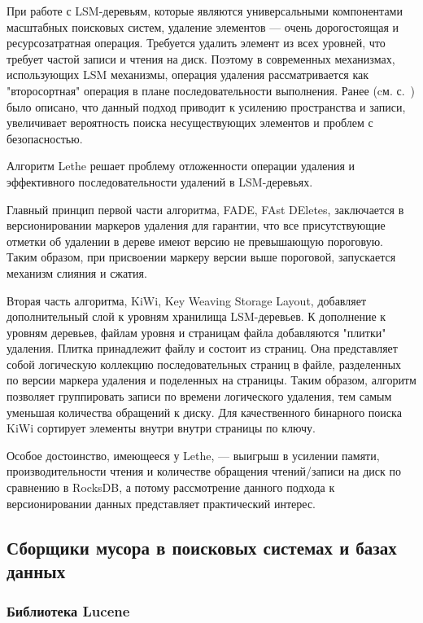 При работе с LSM-деревьям, которые являются универсальными компонентами масштабных
поисковых систем, удаление элементов — очень дорогостоящая и ресурсозатратная операция.
Требуется удалить элемент из всех уровней, что требует частой записи и чтения на диск.
Поэтому в современных механизмах, использующих LSM механизмы, операция удаления
рассматривается как "второсортная" операция в плане последовательности выполнения.
Ранее (cм. с.~\pageref{amplification}) было описано, что данный подход приводит к
усилению пространства и записи, увеличивает вероятность поиска несуществующих
элементов и проблем с безопасностью.

Алгоритм Lethe \cite{Lethe:2020} решает проблему отложенности операции удаления и
эффективного последовательности удалений в LSM-деревьях. 

Главный принцип первой части алгоритма, FADE, FAst DEletes, заключается в 
версионировании маркеров удаления для гарантии, что все присутствующие отметки об
удалении в дереве имеют версию не превышающую пороговую. Таким образом, при присвоении
маркеру версии выше пороговой, запускается механизм слияния и сжатия.

Вторая часть алгоритма, KiWi, Key Weaving Storage Layout, добавляет
дополнительный слой к уровням хранилища LSM-деревьев. К дополнение к уровням деревьев,
файлам уровня и страницам файла добавляются "плитки" удаления. Плитка принадлежит 
файлу и состоит из страниц. Она представляет собой логическую коллекцию последовательных
страниц в файле, разделенных по версии маркера удаления и поделенных на страницы.
Таким образом, алгоритм позволяет группировать записи по времени логического удаления,
тем самым уменьшая количества обращений к диску. Для качественного бинарного поиска KiWi
сортирует элементы внутри внутри страницы по ключу.

Особое достоинство, имеющееся у Lethe, — выигрыш в усилении памяти, производительности
чтения и  количестве обращения чтений/записи на диск по сравнению в RocksDB,
а потому рассмотрение данного подхода к версионировании данных представляет практический интерес.

\subsection{Сборщики мусора в поисковых системах и базах данных}

\subsubsection{Библиотека Lucene}

